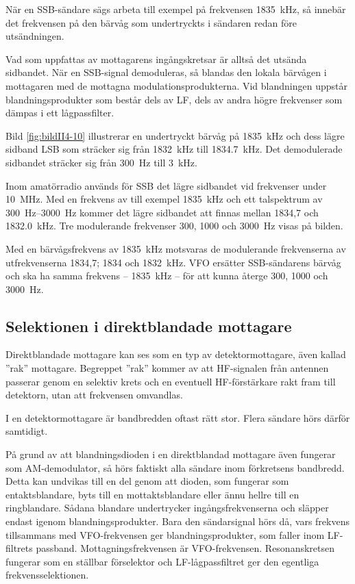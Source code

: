 När en SSB-sändare sägs arbeta till exempel på frekvensen
\SI{1835}{\kilo\hertz}, så innebär det frekvensen på den bärvåg som undertryckts
i sändaren redan före utsändningen.

Vad som uppfattas av mottagarens ingångskretsar är alltså det utsända sidbandet.
När en SSB-signal demoduleras, så blandas den lokala bärvågen i mottagaren med
de mottagna modulationsprodukterna.
Vid blandningen uppstår blandningsprodukter som består dels av LF, dels av
andra högre frekvenser som dämpas i ett lågpassfilter.

Bild \ref{fig:bildII4-10} illustrerar en undertryckt bärvåg på
\SI{1835}{\kilo\hertz} och dess lägre sidband LSB som sträcker sig från
\SI{1832}{\kilo\hertz} till \SI{1834,7}{\kilo\hertz}.
Det demodulerade sidbandet sträcker sig från \SI{300}{\hertz} till
\SI{3}{\kilo\hertz}.

Inom amatörradio används för SSB det lägre sidbandet vid frekvenser
under \SI{10}{\mega\hertz}.
Med en frekvens av till exempel \SI{1835}{\kilo\hertz} och ett talspektrum av
\SIrange{300}{3000}{\hertz} kommer det lägre sidbandet att finnas mellan 1834,7
och \SI{1832,0}{\kilo\hertz}.
Tre modulerande frekvenser 300, 1000 och \SI{3000}{\hertz} visas på bilden.

Med en bärvågsfrekvens av \SI{1835}{\kilo\hertz} motsvaras de modulerande
frekvenserna av utfrekvenserna 1834,7; 1834 och \SI{1832}{\kilo\hertz}.
VFO ersätter SSB-sändarens bärvåg och ska ha samma frekvens --
\SI{1835}{\kilo\hertz} -- för att kunna återge 300, 1000 och \SI{3000}{\hertz}.

\subsection{Selektionen i direktblandade mottagare}
\label{selektion_direktblandade}

Direktblandade mottagare kan ses som en typ av detektormottagare, även
kallad ''rak'' mottagare.
Begreppet ''rak'' kommer av att HF-signalen från antennen passerar genom en
selektiv krets och en eventuell HF-förstärkare rakt fram till detektorn,
utan att frekvensen omvandlas.

I en detektormottagare är bandbredden oftast rätt stor.
Flera sändare hörs därför samtidigt.

På grund av att blandningsdioden i en direktblandad mottagare även fungerar
som AM-demodulator, så hörs faktiskt alla sändare inom förkretsens bandbredd.
Detta kan undvikas till en del genom att dioden, som fungerar som
entaktsblandare, byts till en mottaktsblandare eller ännu hellre till en
ringblandare.
Sådana blandare undertrycker ingångsfrekvenserna och släpper endast igenom
blandningsprodukter.
Bara den sändarsignal hörs då, vars frekvens tillsammans med VFO-frekvensen
ger blandningsprodukter, som faller inom LF-filtrets passband.
Mottagningsfrekvensen är VFO-frekvensen.
Resonanskretsen fungerar som en ställbar förselektor och LF-lågpassfiltret
ger den egentliga frekvensselektionen.

